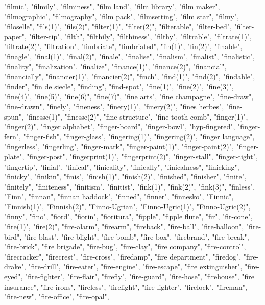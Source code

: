"filmic",
"filmily",
"filminess",
"film land",
"film library",
"film maker",
"filmographic",
"filmography",
"film pack",
"filmsetting",
"film star",
"filmy",
"filoselle",
"fils(1)",
"fils(2)",
"filter(1)",
"filter(2)",
"filterable",
"filter-bed",
"filter-paper",
"filter-tip",
"filth",
"filthily",
"filthiness",
"filthy",
"filtrable",
"filtrate(1)",
"filtrate(2)",
"filtration",
"fimbriate",
"fimbriated",
"fin(1)",
"fin(2)",
"finable",
"finagle",
"final(1)",
"final(2)",
"finale",
"finalise",
"finalism",
"finalist",
"finalistic",
"finality",
"finalization",
"finalize",
"finance(1)",
"finance(2)",
"financial",
"financially",
"financier(1)",
"financier(2)",
"finch",
"find(1)",
"find(2)",
"findable",
"finder",
"fin de siecle",
"finding",
"find-spot",
"fine(1)",
"fine(2)",
"fine(3)",
"fine(4)",
"fine(5)",
"fine(6)",
"fine(7)",
"fine arts",
"fine champagne",
"fine-draw",
"fine-drawn",
"finely",
"fineness",
"finery(1)",
"finery(2)",
"fines herbes",
"fine-spun",
"finesse(1)",
"finesse(2)",
"fine structure",
"fine-tooth comb",
"finger(1)",
"finger(2)",
"finger alphabet",
"finger-board",
"finger-bowl",
"hyp-fingered",
"finger-fern",
"finger-fish",
"finger-glass",
"fingering(1)",
"fingering(2)",
"finger language",
"fingerless",
"fingerling",
"finger-mark",
"finger-paint(1)",
"finger-paint(2)",
"finger-plate",
"finger-post",
"fingerprint(1)",
"fingerprint(2)",
"finger-stall",
"finger-tight",
"fingertip",
"finial",
"finical",
"finicality",
"finically",
"finicalness",
"finicking",
"finicky",
"finikin",
"finis",
"finish(1)",
"finish(2)",
"finished",
"finisher",
"finite",
"finitely",
"finiteness",
"finitism",
"finitist",
"fink(1)",
"fink(2)",
"fink(3)",
"finless",
"Finn",
"finnan",
"finnan haddock",
"finned",
"finner",
"finnesko",
"Finnic",
"Finnish(1)",
"Finnish(2)",
"Finno-Ugrian",
"Finno-Ugric(1)",
"Finno-Ugric(2)",
"finny",
"fino",
"fiord",
"fiorin",
"fioritura",
"fipple",
"fipple flute",
"fir",
"fir-cone",
"fire(1)",
"fire(2)",
"fire-alarm",
"firearm",
"fireback",
"fire-ball",
"fire-balloon",
"fire-bird",
"fire-blast",
"fire-blight",
"fire-bomb",
"fire-box",
"firebrand",
"fire-break",
"fire-brick",
"fire brigade",
"fire-bug",
"fire-clay",
"fire company",
"fire-control",
"firecracker",
"firecrest",
"fire-cross",
"firedamp",
"fire department",
"firedog",
"fire-drake",
"fire-drill",
"fire-eater",
"fire-engine",
"fire-escape",
"fire extinguisher",
"fire-eyed",
"fire-fighter",
"fire-flair",
"firefly",
"fire-guard",
"fire-hose",
"firehouse",
"fire insurance",
"fire-irons",
"fireless",
"firelight",
"fire-lighter",
"firelock",
"fireman",
"fire-new",
"fire-office",
"fire-opal",
